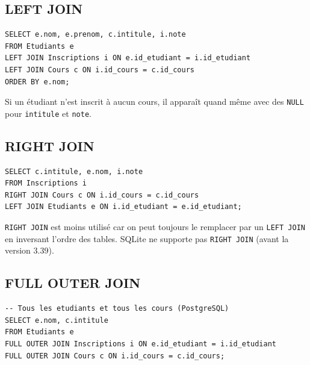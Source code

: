 \subsection{LEFT JOIN}

\begin{codeblock}[title=\textbf{LEFT JOIN --- tous les \'etudiants, m\^eme sans inscription}]
\begin{verbatim}
SELECT e.nom, e.prenom, c.intitule, i.note
FROM Etudiants e
LEFT JOIN Inscriptions i ON e.id_etudiant = i.id_etudiant
LEFT JOIN Cours c ON i.id_cours = c.id_cours
ORDER BY e.nom;
\end{verbatim}
\end{codeblock}

Si un \'etudiant n'est inscrit \`a aucun cours, il appara\^it quand m\^eme avec
des \texttt{NULL} pour \texttt{intitule} et \texttt{note}.

\subsection{RIGHT JOIN}

\begin{codeblock}[title=\textbf{RIGHT JOIN --- tous les cours, m\^eme sans inscription}]
\begin{verbatim}
SELECT c.intitule, e.nom, i.note
FROM Inscriptions i
RIGHT JOIN Cours c ON i.id_cours = c.id_cours
LEFT JOIN Etudiants e ON i.id_etudiant = e.id_etudiant;
\end{verbatim}
\end{codeblock}

\begin{remarque}
\texttt{RIGHT JOIN} est moins utilis\'e car on peut toujours le remplacer
par un \texttt{LEFT JOIN} en inversant l'ordre des tables.
SQLite ne supporte pas \texttt{RIGHT JOIN} (avant la version 3.39).
\end{remarque}

\subsection{FULL OUTER JOIN}

\begin{codeblock}[title=\textbf{FULL OUTER JOIN}]
\begin{verbatim}
-- Tous les etudiants et tous les cours (PostgreSQL)
SELECT e.nom, c.intitule
FROM Etudiants e
FULL OUTER JOIN Inscriptions i ON e.id_etudiant = i.id_etudiant
FULL OUTER JOIN Cours c ON i.id_cours = c.id_cours;
\end{verbatim}
\end{codeblock}

